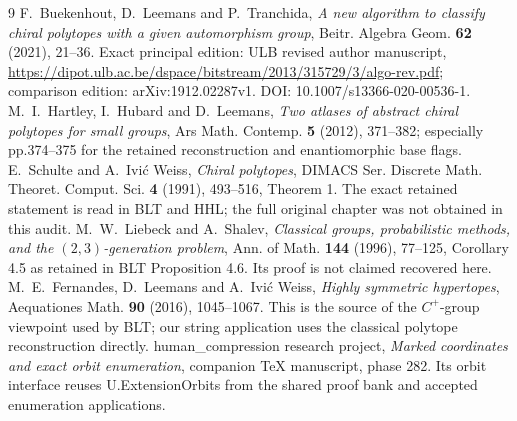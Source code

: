 \documentclass[11pt]{article}
\theoremstyle{remark}\newtheorem{remark}[theorem]{Remark}
\begin{document}
\begin{thebibliography}{9}
 F.~Buekenhout, D.~Leemans and P.~Tranchida, \emph{A new algorithm to classify chiral polytopes with a given automorphism group}, Beitr. Algebra Geom. \textbf{62} (2021), 21--36. Exact principal edition: ULB revised author manuscript, \url{https://dipot.ulb.ac.be/dspace/bitstream/2013/315729/3/algo-rev.pdf}; comparison edition: arXiv:1912.02287v1. DOI: 10.1007/s13366-020-00536-1.
 M.~I.~Hartley, I.~Hubard and D.~Leemans, \emph{Two atlases of abstract chiral polytopes for small groups}, Ars Math. Contemp. \textbf{5} (2012), 371--382; especially pp.374--375 for the retained reconstruction and enantiomorphic base flags.
 E.~Schulte and A.~Ivi\'c Weiss, \emph{Chiral polytopes}, DIMACS Ser. Discrete Math. Theoret. Comput. Sci. \textbf{4} (1991), 493--516, Theorem 1. The exact retained statement is read in BLT and HHL; the full original chapter was not obtained in this audit.
 M.~W.~Liebeck and A.~Shalev, \emph{Classical groups, probabilistic methods, and the $(2,3)$-generation problem}, Ann. of Math. \textbf{144} (1996), 77--125, Corollary 4.5 as retained in BLT Proposition 4.6. Its proof is not claimed recovered here.
 M.~E.~Fernandes, D.~Leemans and A.~Ivi\'c Weiss, \emph{Highly symmetric hypertopes}, Aequationes Math. \textbf{90} (2016), 1045--1067. This is the source of the $C^+$-group viewpoint used by BLT; our string application uses the classical polytope reconstruction directly.
 human\_compression research project, \emph{Marked coordinates and exact orbit enumeration}, companion TeX manuscript, phase 282. Its orbit interface reuses U.ExtensionOrbits from the shared proof bank and accepted enumeration applications.
\end{thebibliography}
\end{document}
